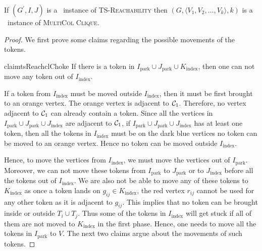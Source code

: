 \begin{lemma}
\label{lemma:backward-reduction-leafage-TS-Reach}
If $(G^\prime, I, J)$ is a \yes\ instance of \textsc{TS-Reachability}
then $(G,\langle V_1,V_2,\ldots,V_k\rangle, k)$ is a \yes\ instance of \textsc{MultiCol Clique}.
\end{lemma}
\begin{proof}
We first prove some claims regarding the possible movements
of the tokens.


\begin{restatable}{claim}{tsReachclChoke}
\label{cl:choke1}
If there is a token in 
$I_{\text{park}} \cup J_{\text{park}} \cup K_{\text{index}}$,
then one can not move any token out of $I_{\text{index}}$.
\end{restatable}
\begin{claimproof}
If a token from $I_\text{index}$ must be moved outside
$I_\text{index}$, then it must be first brought to an orange vertex.
The orange vertex is adjacent to $\mathcal{C}_1$.
Therefore, no vertex adjacent to $\mathcal{C}_1$ can already
contain a token.
Since all the vertices in
$I_{\text{park}}\cup J_{\text{park}} \cup J_{\text{index}}$
are adjacent to $\mathcal{C}_1$, if
$I_{\text{park}}\cup J_{\text{park}} \cup J_{\text{index}}$
has at least one token, then all the tokens in
$I_\text{index}$ must be on the dark blue vertices
no token can be moved to an orange vertex.
Hence no token can be moved outside $I_\text{index}$.
\end{claimproof}

\noindent Hence, to move the vertices from $I_{\text{index}}$,
we must move the vertices out of $I_{\text{park}}$.
Moreover, we can not move these tokens from $I_{\text{park}}$ 
to $J_{\text{park}}$ or to $J_{\text{index}}$ 
before all the tokens out of $I_{\text{index}}$.
We are also not be able to move any of these tokens to
$K_\text{index}$ as once a token lands on
$g_{ij}\in K_\text{index}$, the red vertex $r_{ij }$
cannot be used for any other token as it is adjacent to $g_{ij}$.
This implies that no token can be brought inside or outside
$T_i\cup T_j$.
Thus some of the tokens in $I_{\text{index}}$ will get stuck
if all of them are not moved to $K_\text{index}$ in the first phase.
Hence, one needs to move all the tokens in $I_{\text{park}}$
to $V$.
The next two claims argue about the movements
of such tokens.


\end{proof}
